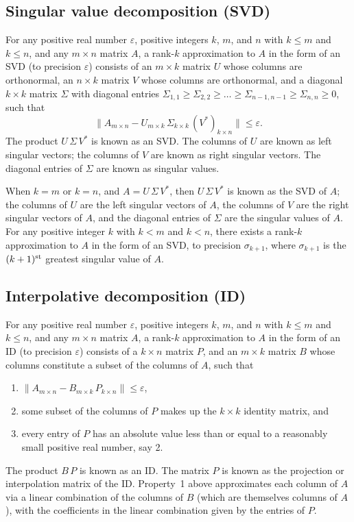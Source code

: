 ﻿\documentclass[letterpaper,12pt]{article}
\def\epsilon{\varepsilon}
\def\st{{\hbox{\scriptsize{\rm st}}}}
\begin{document}
\subsection{Singular value decomposition (SVD)}

For any positive real number $\epsilon$,
positive integers $k$, $m$, and $n$ with $k \le m$ and $k \le n$,
and any $m \times n$ matrix $A$,
a rank-$k$ approximation to $A$ in the form of an SVD
(to precision $\epsilon$) consists of an $m \times k$ matrix $U$
whose columns are orthonormal, an $n \times k$ matrix $V$
whose columns are orthonormal, and a diagonal $k \times k$ matrix
$\Sigma$ with diagonal entries
$\Sigma_{1,1} \ge \Sigma_{2,2} \ge \dots \ge \Sigma_{n-1,n-1}
                                         \ge \Sigma_{n,n} \ge 0$,
such that
%
\begin{equation}
\| A_{m \times n} - U_{m \times k} \, \Sigma_{k \times k}
                 \, (V^*)_{k \times n} \| \le \epsilon.
\end{equation}
%
The product $U \, \Sigma \, V^*$ is known as an SVD.
The columns of $U$ are known as left singular vectors;
the columns of $V$ are known as right singular vectors.
The diagonal entries of $\Sigma$ are known as singular values.

When $k = m$ or $k = n$, and $A = U \, \Sigma \, V^*$,
then $U \, \Sigma \, V^*$ is known as the SVD
of $A$; the columns of $U$ are the left singular vectors of $A$,
the columns of $V$ are the right singular vectors of $A$,
and the diagonal entries of $\Sigma$ are the singular values of $A$.
For any positive integer $k$ with $k < m$ and $k < n$,
there exists a rank-$k$ approximation to $A$ in the form of an SVD,
to precision $\sigma_{k+1}$, where $\sigma_{k+1}$ is the $(k+1)^\st$
greatest singular value of $A$.


\subsection{Interpolative decomposition (ID)}

For any positive real number $\epsilon$,
positive integers $k$, $m$, and $n$ with $k \le m$ and $k \le n$,
and any $m \times n$ matrix $A$,
a rank-$k$ approximation to $A$ in the form of an ID
(to precision $\epsilon$) consists of a $k \times n$ matrix $P$,
and an $m \times k$ matrix $B$ whose columns constitute a subset
of the columns of $A$, such that
%
\begin{enumerate}
\item $\| A_{m \times n} - B_{m \times k} \, P_{k \times n} \|
      \le \epsilon$,
\item some subset of the columns of $P$ makes up the $k \times k$
      identity matrix, and
\item every entry of $P$ has an absolute value less than or equal
      to a reasonably small positive real number, say 2.
\end{enumerate}
%
The product $B \, P$ is known as an ID.
The matrix $P$ is known as the projection or interpolation matrix
of the ID. Property~1 above approximates each column of $A$
via a linear combination of the columns of $B$
(which are themselves columns of $A$), with the coefficients
in the linear combination given by the entries of $P$.
\end{document}
